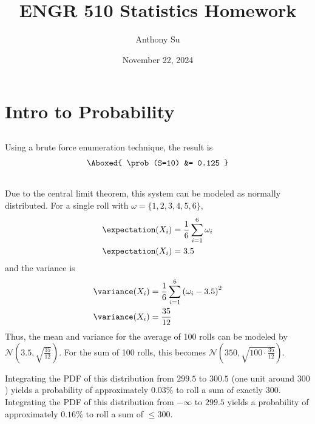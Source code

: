 \documentclass[11pt]{article}
\title{ENGR 510 Statistics Homework}
\author{Anthony Su}
\date{November 22, 2024}
\begin{document}
\thispagestyle{plain}
\maketitle


\section{Intro to Probability}

\subsection{}  %
Using a brute force enumeration technique, the result is
\begin{align*}
    \Aboxed{
        \prob(S=10) &= 0.125
    }
\end{align*}

\subsection{}  %
Due to the central limit theorem, this system can be modeled as normally
distributed. For a single roll with $\omega = \{1, 2, 3, 4, 5, 6\}$,
\begin{align*}
    \expectation (X_i) &= \frac{1}{6} \sum_{i=1}^{6} \omega_i \\
    \expectation (X_i) &= 3.5
\end{align*}
and the variance is
\begin{align*}
    \variance (X_i) &= \frac{1}{6} \sum_{i=1}^{6} \left( \omega_i - 3.5 \right)^2 \\
    \variance (X_i) &= \frac{35}{12}
\end{align*}
Thus, the mean and variance for the average of 100 rolls can be modeled by $\mathcal{N}\left(3.5, \sqrt{\frac{35}{12}}\right)$.
For the sum of 100 rolls, this becomes $\mathcal{N}\left(350, \sqrt{100 \cdot \frac{35}{12}}\right)$.

Integrating the PDF of this distribution from $299.5$ to $300.5$ (one unit around $300$)
yields a probability of approximately $0.03\%$ to roll a sum of exactly $300$.
Integrating the PDF of this distribution from $-\infty$ to $299.5$ yields a
probability of approximately $0.16\%$ to roll a sum of $\leq300$.
\end{document}

